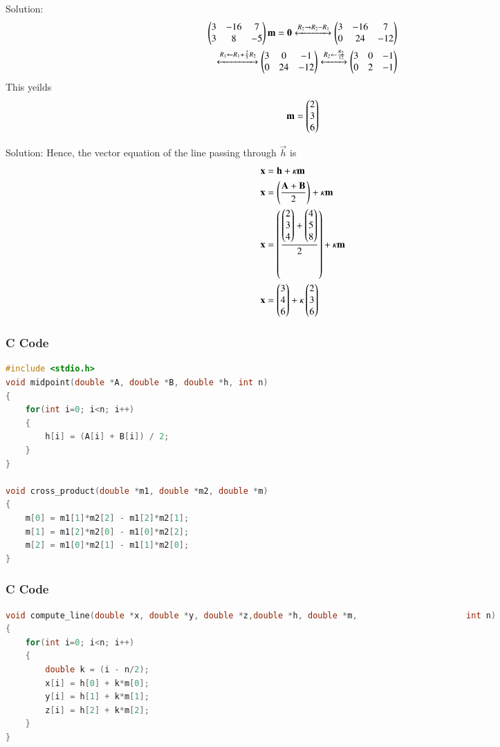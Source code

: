 \documentclass{beamer}
\begin{document}
\begin{frame}{Solution:}
\begin{align}
    \begin{pmatrix}3 & -16 & 7 \\ 3 & 8 & -5\end{pmatrix}\mathbf{m} = \mathbf{0} \xleftrightarrow[]
    {R_2\rightarrow R_2 - R_1} \begin{pmatrix}3 & -16 & 7 \\ 0 & 24 & -12\end{pmatrix}\\ 
    \xleftrightarrow[]{R_1\leftarrow R_1 + \frac{2}{3}R_2} \begin{pmatrix}3 & 0 & -1 \\ 0 & 24 & -12\end{pmatrix} \xleftrightarrow[]{R_2\leftarrow \frac{R_2}{12}}\begin{pmatrix}3 & 0 & -1 \\ 0 & 2 & -1\end{pmatrix}
\end{align}
This yeilds
\begin{align}
    \mathbf{m} = \begin{pmatrix}2 \\ 3 \\ 6\end{pmatrix}
\end{align}
\end{frame}

\begin{frame}{Solution:}
Hence, the vector equation of the line passing through $\vec{h}$ is 
\begin{align}
    \mathbf{x} &= \mathbf{h} + \kappa \mathbf{m}\\
    \mathbf{x} &= \left(\frac{\mathbf{A} + \mathbf{B}}{2}\right) + \kappa \mathbf{m}\\
    \mathbf{x} &= \left(\frac{\begin{pmatrix}2 \\ 3 \\ 4\end{pmatrix} + \begin{pmatrix}4 \\ 5 \\ 8\end{pmatrix}}{2}\right) + \kappa \mathbf{m}\\
    \mathbf{x} &= \begin{pmatrix}3 \\ 4 \\ 6\end{pmatrix} + \kappa \begin{pmatrix}2 \\ 3 \\ 6\end{pmatrix}
\end{align}
\end{frame}



\begin{frame}[fragile]
  \frametitle{C Code}
  \begin{lstlisting}[language=C]
#include <stdio.h>
void midpoint(double *A, double *B, double *h, int n)
{
    for(int i=0; i<n; i++)
    {
        h[i] = (A[i] + B[i]) / 2;
    }
}

void cross_product(double *m1, double *m2, double *m)
{
    m[0] = m1[1]*m2[2] - m1[2]*m2[1];
    m[1] = m1[2]*m2[0] - m1[0]*m2[2];
    m[2] = m1[0]*m2[1] - m1[1]*m2[0];
}
  \end{lstlisting}
\end{frame}
\begin{frame}[fragile]
  \frametitle{C Code}
  \begin{lstlisting}[language=C]
void compute_line(double *x, double *y, double *z,double *h, double *m,                      int n)
{
    for(int i=0; i<n; i++)
    {
        double k = (i - n/2);  
        x[i] = h[0] + k*m[0];
        y[i] = h[1] + k*m[1];
        z[i] = h[2] + k*m[2];
    }
}
  \end{lstlisting}
\end{frame}
\end{document}
